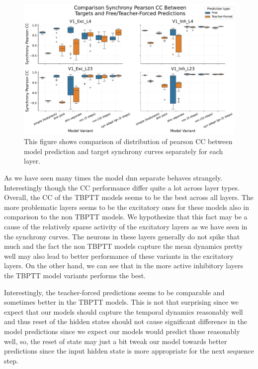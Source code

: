 \begin{figure}
    \centering
    \includegraphics[width=\linewidth]{img/plots/boxplot_model_comparison_synchrony_pearson_layers.pdf}
    \caption{This figure shows comparison of distribution of pearson CC between model prediction and target synchrony curves separately for each layer.}
    \label{fig:boxplot_models_pearson_synchrony_different_layers}
\end{figure}

As we have seen many times the model dnn separate behaves strangely. Interestingly though the CC performance differ quite a lot across layer types. Overall, the CC of the TBPTT models seems to be the best across all layers. The more problematic layers seems to be the excitatory ones for these models also in comparison to the non TBPTT models. We hypothesize that this fact may be a cause of the relatively sparse activity of the excitatory layers as we have seen in the synchrony curves. The neurons in these layers generally do not spike that much and the fact the non TBPTT models capture the mean dynamics pretty well may also lead to better performance of these variants in the excitatory layers. On the other hand, we can see that in the more active inhibitory layers the TBPTT model variants performs the best. 

Interestingly, the teacher-forced predictions seems to be comparable and sometimes better in the TBPTT models. This is not that surprising since we expect that our models should capture the temporal dynamics reasonably well and thus reset of the hidden states should not cause significant difference in the model predictions since we expect our models would predict those reasonably well, so, the reset of state may just a bit tweak our model towards better predictions since the input hidden state is more appropriate for the next sequence step. 

